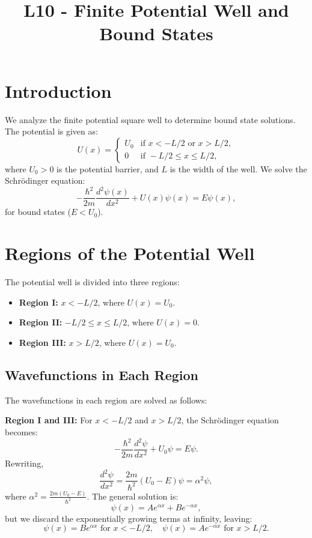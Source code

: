 \documentclass[a4paper,12pt]{article}
\begin{document}
\title{L10 - Finite Potential Well and Bound States}
\author{}
\date{}
\maketitle
\begin{multicols}{2}

\section{Introduction}
We analyze the finite potential square well to determine bound state solutions. The potential is given as:
\[
U(x) = 
\begin{cases} 
U_0 & \text{if } x < -L/2 \text{ or } x > L/2, \\
0 & \text{if } -L/2 \leq x \leq L/2,
\end{cases}
\]
where \( U_0 > 0 \) is the potential barrier, and \( L \) is the width of the well. We solve the Schrödinger equation:
\[
-\frac{\hbar^2}{2m} \frac{d^2\psi(x)}{dx^2} + U(x)\psi(x) = E\psi(x),
\]
for bound states (\( E < U_0 \)).

\section{Regions of the Potential Well}
The potential well is divided into three regions:

\begin{itemize}
    \item \textbf{Region I:} \( x < -L/2 \), where \( U(x) = U_0 \).
    \item \textbf{Region II:} \( -L/2 \leq x \leq L/2 \), where \( U(x) = 0 \).
    \item \textbf{Region III:} \( x > L/2 \), where \( U(x) = U_0 \).
\end{itemize}

\subsection{Wavefunctions in Each Region}
The wavefunctions in each region are solved as follows:

\textbf{Region I and III:} For \( x < -L/2 \) and \( x > L/2 \), the Schrödinger equation becomes:
\[
-\frac{\hbar^2}{2m} \frac{d^2\psi}{dx^2} + U_0\psi = E\psi.
\]
Rewriting, 
\[
\frac{d^2\psi}{dx^2} = \frac{2m}{\hbar^2}(U_0 - E)\psi = \alpha^2 \psi,
\]
where \( \alpha^2 = \frac{2m(U_0 - E)}{\hbar^2} \). The general solution is:
\[
\psi(x) = A e^{\alpha x} + B e^{-\alpha x},
\]
but we discard the exponentially growing terms at infinity, leaving:
\[
\psi(x) = B e^{\alpha x} \text{ for } x < -L/2, \quad \psi(x) = A e^{-\alpha x} \text{ for } x > L/2.
\]


\end{multicols}
\end{document}
